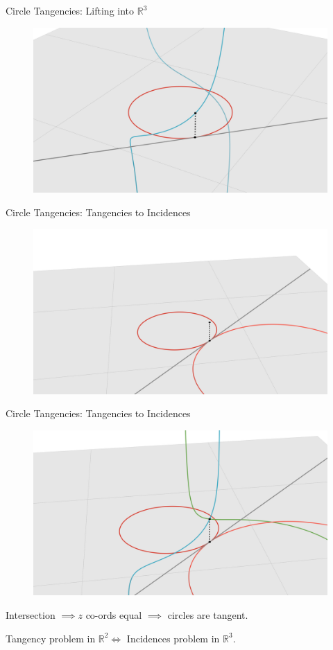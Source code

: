 \documentclass{beamer}
\newcommand{\RR}{\mathbb R}
\newcommand{\nfr}[1]{\begin{frame} #1
\end{frame}}
\begin{document}
\nfr{{Circle Tangencies: Lifting into $\RR^3$}

\begin{figure}[h]
    \centering
    \includegraphics[width=0.8
    \textwidth, trim={5cm 0 4cm 2cm}, clip=true]{images/Diagram3d.png}
\end{figure}

}




\nfr{{Circle Tangencies: Tangencies to Incidences}

\begin{figure}[h]
    \centering
    \includegraphics[width=0.8
    \textwidth, trim={5cm 0 4cm 2cm}, clip=true]{images/Diagram4a.png}
\end{figure}


}

\nfr{{Circle Tangencies: Tangencies to Incidences}

\begin{figure}[h]
    \centering
    \includegraphics[width=0.8
    \textwidth, trim={5cm 0 4cm 2cm}, clip=true]{images/Diagram4b.png}
\end{figure}
Intersection  $\implies z$ co-ords equal $\implies$  circles are tangent.

Tangency problem in $\RR^2 \iff $ Incidences problem in $\RR^3$.
}
\end{document}
